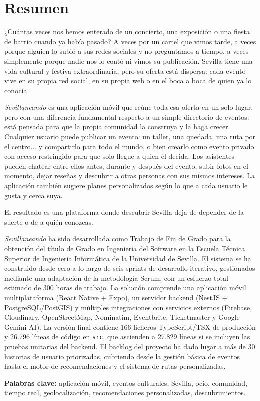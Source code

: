\chapter*{Resumen}
¿Cuántas veces nos hemos enterado de un concierto, una exposición o una fiesta de barrio cuando ya había pasado? A veces por un cartel que vimos tarde, a veces porque alguien lo subió a sus redes sociales y no preguntamos a tiempo, a veces simplemente porque nadie nos lo contó ni vimos su publicación. Sevilla tiene una vida cultural y festiva extraordinaria, pero su oferta está dispersa: cada evento vive en su propia red social, en su propia web o en el boca a boca de quien ya lo conocía.

\textit{Sevillaneando} es una aplicación móvil que reúne toda esa oferta en un solo lugar, pero con una diferencia fundamental respecto a un simple directorio de eventos: está pensada para que la propia comunidad la construya y la haga crecer. Cualquier usuario puede publicar un evento: un taller, una quedada, una ruta por el centro... y compartirlo para todo el mundo, o bien crearlo como evento privado con acceso restringido para que solo llegue a quien él decida. Los asistentes pueden chatear entre ellos antes, durante y después del evento, subir fotos en el momento, dejar reseñas y descubrir a otras personas con sus mismos intereses. La aplicación también sugiere planes personalizados según lo que a cada usuario le gusta y cerca suya.

El resultado es una plataforma donde descubrir Sevilla deja de depender de la suerte o de a quién conozcas.

\textit{Sevillaneando} ha sido desarrollada como Trabajo de Fin de Grado para la obtención del título de Grado en Ingeniería del Software en la Escuela Técnica Superior de Ingeniería Informática de la Universidad de Sevilla. El sistema se ha construido desde cero a lo largo de seis sprints de desarrollo iterativo, gestionados mediante una adaptación de la metodología Scrum, con un esfuerzo total estimado de 300 horas de trabajo. La solución comprende una aplicación móvil multiplataforma (React Native + Expo), un servidor backend (NestJS + PostgreSQL/PostGIS) y múltiples integraciones con servicios externos (Firebase, Cloudinary, OpenStreetMap, Nominatim, Eventbrite, Ticketmaster y Google Gemini AI). La versión final contiene 166 ficheros TypeScript/TSX de producción y 26.796 líneas de código en \texttt{src}, que ascienden a 27.829 líneas si se incluyen las pruebas unitarias del backend. El backlog del proyecto ha dado lugar a más de 30 historias de usuario priorizadas, cubriendo desde la gestión básica de eventos hasta el motor de recomendaciones y el sistema de rutas personalizadas.

\vspace{.5cm}

\textbf{Palabras clave:} aplicación móvil, eventos culturales, Sevilla, ocio, comunidad, tiempo real, geolocalización, recomendaciones personalizadas, descubrimientos.
